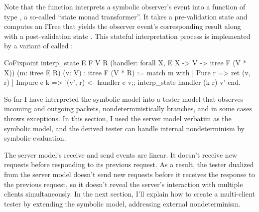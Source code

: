 Note that the  function interprets a symbolic observer's event
 into a function of type , a so-called
``state monad transformer''.  It takes a pre-validation state  and
computes an ITree that yields the observer event's corresponding result
 along with a post-validation state .  This stateful
interpretation process is implemented by a variant of  called
:
\begin{coq}
  CoFixpoint interp_state {E F V R}
                          (handler: forall {X}, E X -> V -> itree F (V * X))
                          (m: itree E R) (v: V)
             : itree F (V * R) :=
    match m with
    | Pure   r   => ret (v, r)
    | Impure e k => '(v', r) <- handler e v;;
                    interp_state handler (k r) v'
    end.
\end{coq}

So far I have interpreted the symbolic model into a tester model that observes
incoming and outgoing packets, nondeterministically branches, and in some cases
throws exceptions.  In this section, I used the server model verbatim as the
symbolic model, and the derived tester can handle internal nondeterminism by
symbolic evaluation.

The server model's receive and send events are linear.  It doesn't receive new
requests before responding to its previous request.  As a result, the tester
dualized from the server model doesn't send new requests before it receives the
response to the previous request, so it doesn't reveal the server's interaction
with multiple clients simultaneously.  In the next section, I'll explain how to
create a multi-client tester by extending the symbolic model, addressing
external nondeterminism.
